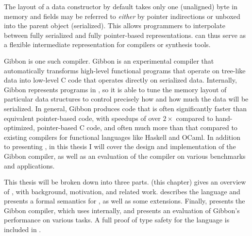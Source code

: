 
The layout of a \ourcalc data constructor by default takes only one (unaligned)
byte in memory and fields may be referred to \emph{either} by pointer
indirections or unboxed into the parent object (serialized). This allows
programmers to interpolate between fully serialized and fully pointer-based
representations.
%
\ourcalc can thus serve as a flexible intermediate representation for compilers
or synthesis tools.

Gibbon is one such compiler. Gibbon is an experimental compiler that
automatically transforms high-level functional programs that operate on
tree-like data into low-level C code that operates directly on serialized data.
Internally, Gibbon represents programs in \ourcalc, so it is able to tune the
memory layout of particular data structures to control precisely how and how
much the data will be serialized. In general, Gibbon produces code that is often
significantly faster than equivalent pointer-based code, with speedups of over
$2\times$ compared to hand-optimized, pointer-based C code, and often much more
than that compared to existing compilers for functional languages like Haskell
and OCaml. In addition to presenting \ourcalc, in this thesis I will cover
the design and implementation of the Gibbon compiler, as well as an evaluation
of the compiler on various benchmarks and applications.


This thesis will be broken down into three parts.  (this
chapter) gives an overview of \ourcalc, with background, motivation, and related
work.  describes the language and presents a formal
semantics for \ourcalc, as well as some extensions. Finally,
 presents the Gibbon compiler, which uses \ourcalc
internally, and presents an evaluation of Gibbon's performance on various tasks.
A full proof of type safety for the \ourcalc language is included in .



